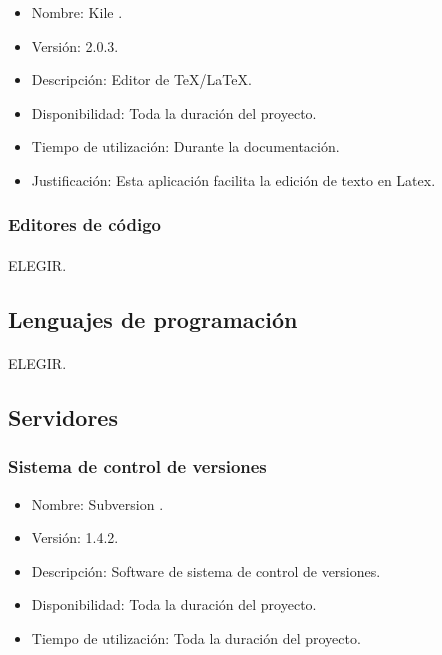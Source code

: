       \begin{itemize}
         \item Nombre: Kile \cite{kile}.
         \item Versión: 2.0.3.
         \item Descripción: Editor de TeX/LaTeX.
         \item Disponibilidad: Toda la duración del proyecto.
         \item Tiempo de utilización: Durante la documentación.
         \item Justificación: Esta aplicación facilita la edición de texto en
         Latex.
      \end{itemize}

      \subsubsection{Editores de código}

      \paragraph{}ELEGIR.

   \subsection{Lenguajes de programación}

   \paragraph{}ELEGIR.

   \subsection{Servidores}

      \subsubsection{Sistema de control de versiones}

         \begin{itemize}
            \item Nombre: Subversion \cite{subversion}.
            \item Versión: 1.4.2.
            \item Descripción: Software de sistema de control de versiones.
            \item Disponibilidad: Toda la duración del proyecto.
            \item Tiempo de utilización: Toda la duración del proyecto.
         \end{itemize}

